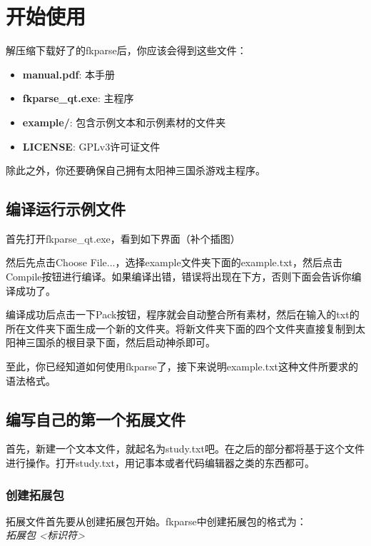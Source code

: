 \chapter{开始使用}

解压缩下载好了的fkparse后，你应该会得到这些文件：

\begin{itemize}
 \item \textbf{manual.pdf}: 本手册
 \item \textbf{fkparse_qt.exe}: 主程序
 \item \textbf{example/}: 包含示例文本和示例素材的文件夹
 \item \textbf{LICENSE}: GPLv3许可证文件
\end{itemize}

除此之外，你还要确保自己拥有太阳神三国杀游戏主程序。

\section{编译运行示例文件}

首先打开fkparse_qt.exe，看到如下界面（补个插图）

然后先点击Choose File...，选择example文件夹下面的example.txt，然后点击Compile按钮进行编译。如果编译出错，错误将出现在下方，否则下面会告诉你编译成功了。

编译成功后点击一下Pack按钮，程序就会自动整合所有素材，然后在输入的txt的所在文件夹下面生成一个新的文件夹。将新文件夹下面的四个文件夹直接复制到太阳神三国杀的根目录下面，然后启动神杀即可。

至此，你已经知道如何使用fkparse了，接下来说明example.txt这种文件所要求的语法格式。

\section{编写自己的第一个拓展文件}

首先，新建一个文本文件，就起名为study.txt吧。在之后的部分都将基于这个文件进行操作。打开study.txt，用记事本或者代码编辑器之类的东西都可。

\subsection{创建拓展包}

拓展文件首先要从创建拓展包开始。fkparse中创建拓展包的格式为：\\

\emph{拓展包 <标识符>} \\

